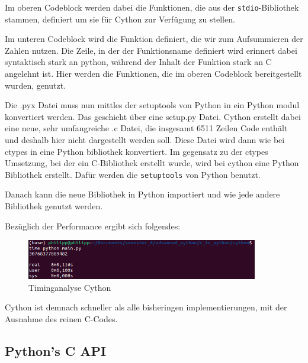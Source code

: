 \documentclass[a4paper, parskip=half]{scrartcl}
\begin{document}
Im oberen Codeblock werden dabei die Funktionen, die aus der \lstinline{stdio}-Bibliothek stammen, definiert um sie für Cython zur Verfügung zu stellen.

Im unteren Codeblock wird die Funktion definiert, die wir zum Aufsummieren der Zahlen nutzen. Die Zeile, in der der Funktionsname definiert wird erinnert dabei syntaktisch stark an python, während der Inhalt der Funktion stark an C angelehnt ist. Hier werden die Funktionen, die im oberen Codeblock bereitgestellt wurden, genutzt.  

Die .pyx Datei muss nun mittles der setuptools von Python in ein Python modul konvertiert werden. Das geschieht über eine setup.py Datei. 
Cython erstellt dabei eine neue, sehr umfangreiche .c Datei, die insgesamt 6511 Zeilen Code enthält und deshalb hier nicht dargestellt werden soll. 
Diese Datei wird dann wie bei ctypes in eine Python bibliothek konvertiert. Im gegensatz zu der ctypes Umsetzung, bei der ein C-Bibliothek erstellt wurde, wird bei cython eine Python Bibliothek erstellt. Dafür werden die \lstinline{setuptools} von Python benutzt.\cite{cython-setup}



Danach kann die neue Bibliothek in Python importiert und wie jede andere Bibliothek genutzt werden.



Bezüglich der Performance ergibt sich folgendes:

\begin{figure}[H]
    \centering
    \includegraphics[width=0.9\textwidth]{cython/timing_cython.png}
    \caption{Timinganalyse Cython}
    \label{fig:timing_cython}
\end{figure}


\begin{center}
    
\end{center}

Cython ist demnach schneller als alle bisheringen implementierungen, mit der Ausnahme des reinen C-Codes.



\subsection{Python's C API}
\end{document}
